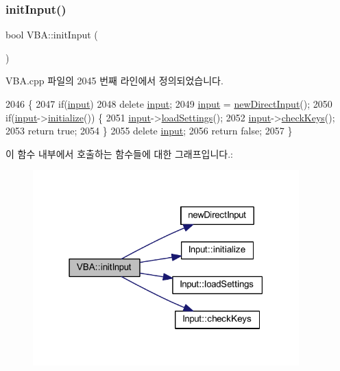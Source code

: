 \subsubsection{\texorpdfstring{init\+Input()}{initInput()}}
{\footnotesize\ttfamily bool V\+B\+A\+::init\+Input (\begin{DoxyParamCaption}{ }\end{DoxyParamCaption})}



V\+B\+A.\+cpp 파일의 2045 번째 라인에서 정의되었습니다.


\begin{DoxyCode}
2046 \{
2047   \textcolor{keywordflow}{if}(\mbox{\hyperlink{class_v_b_a_aaab971cb5d67a69e1a26502d15a4dc60}{input}})
2048     \textcolor{keyword}{delete} \mbox{\hyperlink{class_v_b_a_aaab971cb5d67a69e1a26502d15a4dc60}{input}};
2049   \mbox{\hyperlink{class_v_b_a_aaab971cb5d67a69e1a26502d15a4dc60}{input}} = \mbox{\hyperlink{_v_b_a_8cpp_a93c7d83181c7df44bc628c163ab7ef25}{newDirectInput}}();
2050   \textcolor{keywordflow}{if}(\mbox{\hyperlink{class_v_b_a_aaab971cb5d67a69e1a26502d15a4dc60}{input}}->\mbox{\hyperlink{class_input_affd45f0c278a6ff71b7ae1a567a3dc1c}{initialize}}()) \{
2051     \mbox{\hyperlink{class_v_b_a_aaab971cb5d67a69e1a26502d15a4dc60}{input}}->\mbox{\hyperlink{class_input_a098708c062b906c84ab036c04d447a29}{loadSettings}}();
2052     \mbox{\hyperlink{class_v_b_a_aaab971cb5d67a69e1a26502d15a4dc60}{input}}->\mbox{\hyperlink{class_input_a91418a5762e6e50aa4f59e4ce92d2dfa}{checkKeys}}();
2053     \textcolor{keywordflow}{return} \textcolor{keyword}{true};
2054   \}
2055   \textcolor{keyword}{delete} \mbox{\hyperlink{class_v_b_a_aaab971cb5d67a69e1a26502d15a4dc60}{input}};
2056   \textcolor{keywordflow}{return} \textcolor{keyword}{false};
2057 \}
\end{DoxyCode}
이 함수 내부에서 호출하는 함수들에 대한 그래프입니다.\+:
\nopagebreak
\begin{figure}[H]
\begin{center}
\leavevmode
\includegraphics[width=291pt]{class_v_b_a_ac19c75e259950ddd9bb5e97d73203ebb_cgraph}
\end{center}
\end{figure}
